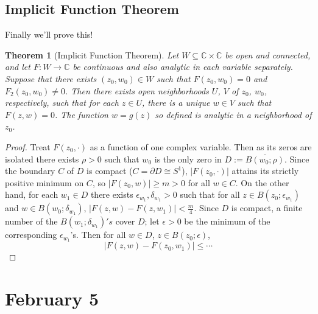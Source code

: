 \documentclass[12pt]{article}
\newcommand{\cx}{\mathbb{C}}
\newtheorem{theorem}{Theorem}[section]
\theoremstyle{definition}
\theoremstyle{remark}
\begin{document}
\subsection{Implicit Function Theorem}
Finally we'll prove this!
\begin{theorem}[Implicit Function Theorem]
    Let $W\subseteq\cx\times\cx$ be open and connected, and let $F:W\to\cx$ be continuous and also analytic in each variable separately. Suppose that there exists $(z_0,w_0)\in W$ such that $F(z_0,w_0)=0$ and $F_2(z_0,w_0)\neq0$. Then there exists open neighborhoods $U$, $V$ of $z_0$, $w_0$, respectively, such that for each $z\in U$, there is a unique $w\in V$ such that $F(z,w)=0$. The function $w=g(z)$ so defined is analytic in a neighborhood of $z_0$.
\end{theorem}
\begin{proof}
    Treat $F(z_0,\cdot)$ as a function of one complex variable. Then as its zeros are isolated there exists $\rho>0$ such that $w_0$ is the only zero in $D:=\overline{B(w_0;\rho)}$. Since the boundary $C$ of $D$ is compact ($C=\partial D\cong S^1$), $|F(z_0,\cdot)|$ attains its strictly positive minimum on $C$, so $|F(z_0,w)|\geq m>0$ for all $w\in C$. On the other hand, for each $w_1\in D$ there exists $\epsilon_{w_1},\delta_{w_1}>0$ such that for all $z\in B(z_0;\epsilon_{w_1})$ and $w\in B(w_0;\delta_{w_1})$, $|F(z,w)-F(z,w_1)|<\frac{m}{4}$. Since $D$ is compact, a finite number of the $B(w_1;\delta_{w_1})'s$ cover $D$; let $\epsilon>0$ be the minimum of the corresponding $\epsilon_{w_1}$'s. Then for all $w\in D$, $z\in B(z_0;\epsilon)$, 
    \begin{equation}
        |F(z,w)-F(z_0,w_1)|\leq\dotsb
    \end{equation}
\end{proof}
\section{February 5}
\end{document}
